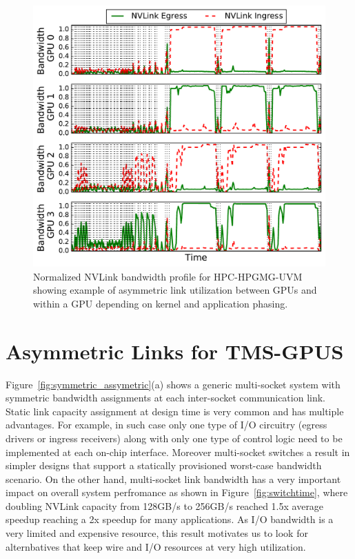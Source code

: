 \begin{figure}[t]
    \centering

        \includegraphics[width=1.0\columnwidth]{figures/bw_profile_HPGMG_UVM_base.pdf}
    \caption{Normalized NVLink bandwidth profile for HPC-HPGMG-UVM showing example of asymmetric 
    link utilization between GPUs and within a GPU depending on kernel and application phasing.}
    \label{fig:link-motivation}
\end{figure}

\section{Asymmetric Links for TMS-GPUS}
\label{interconnect}

Figure~\ref{fig:symmetric_assymetric}(a) shows a generic multi-socket system
with symmetric bandwidth assignments at each inter-socket communication link.
Static link capacity assignment at design time is very common and has multiple
advantages. For example, in such case only one type of I/O circuitry (egress
drivers or ingress receivers) along with only one type of control logic need to
be implemented at each on-chip interface. Moreover multi-socket switches a
result in simpler designs that support a statically provisioned worst-case
bandwidth scenario. On the other hand, multi-socket link bandwidth has a very
important impact on overall system perfromance as shown in
Figure~\ref{fig:switchtime}, where doubling NVLink capacity from 128GB/s to
256GB/s reached 1.5x average speedup reaching a 2x speedup for many
applications. As I/O bandwidth is a very limited and expensive resource, this
result motivates us to look for alternbatives that keep wire and I/O resources
at very high utilization. 



